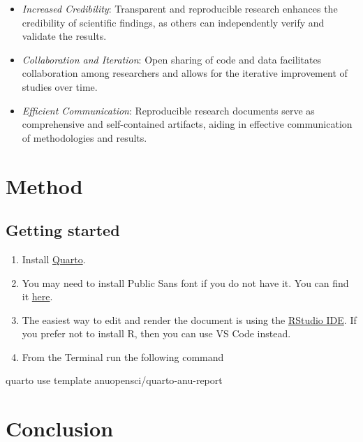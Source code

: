 \documentclass[
  a4paper,
  oneside,
  open=any]{scrbook}
\newenvironment{Shaded}{\begin{snugshade}}{\end{snugshade}}
\newcommand{\ExtensionTok}[1]{\textcolor[rgb]{0.00,0.23,0.31}{#1}}
\newcommand{\NormalTok}[1]{\textcolor[rgb]{0.00,0.23,0.31}{#1}}
\providecommand{\tightlist}{%
  \setlength{\itemsep}{0pt}\setlength{\parskip}{0pt}}\usepackage{longtable,booktabs,array}
\begin{document}
\begin{itemize}
\tightlist
\item
  \emph{Increased Credibility}: Transparent and reproducible research
  enhances the credibility of scientific findings, as others can
  independently verify and validate the results.
\item
  \emph{Collaboration and Iteration}: Open sharing of code and data
  facilitates collaboration among researchers and allows for the
  iterative improvement of studies over time.
\item
  \emph{Efficient Communication}: Reproducible research documents serve
  as comprehensive and self-contained artifacts, aiding in effective
  communication of methodologies and results.
\end{itemize}

\section{Method}\label{method}

\subsection{Getting started}\label{getting-started}

\begin{enumerate}
\def\labelenumi{\arabic{enumi}.}
\tightlist
\item
  Install \href{https://quarto.org/docs/get-started/}{Quarto}.
\item
  You may need to install Public Sans font if you do not have it. You
  can find it
  \href{https://github.com/anuopensci/quarto-anu-report/tree/main/_extensions/anu-report/assets/webfonts}{here}.
\item
  The easiest way to edit and render the document is using the
  \href{https://posit.co/download/rstudio-desktop/}{RStudio IDE}. If you
  prefer not to install R, then you can use VS Code instead.
\item
  From the Terminal run the following command
\end{enumerate}

\begin{Shaded}
\begin{Highlighting}[]
\ExtensionTok{quarto}\NormalTok{ use template anuopensci/quarto{-}anu{-}report}
\end{Highlighting}
\end{Shaded}

\section{Conclusion}\label{conclusion}
\end{document}
